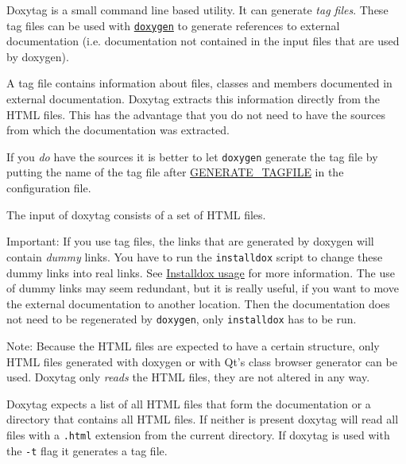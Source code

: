 Doxytag is a small command line based utility. It can generate {\em tag files\/}. These tag files can be used with \href{doxygen_usage.html}{\tt doxygen} to generate references to external documentation (i.e. documentation not contained in the input files that are used by doxygen).

A tag file contains information about files, classes and members documented in external documentation. Doxytag extracts this information directly from the HTML files. This has the advantage that you do not need to have the sources from which the documentation was extracted.

If you {\em do\/} have the sources it is better to let {\tt doxygen} generate the tag file by putting the name of the tag file after \hyperlink{config_cfg_generate_tagfile}{GENERATE\_\-TAGFILE} in the configuration file.

The input of doxytag consists of a set of HTML files.

\begin{Desc}
\item[Important:]If you use tag files, the links that are generated by doxygen will contain {\em dummy\/} links. You have to run the {\tt installdox} script to change these dummy links into real links. See \hyperlink{installdox_usage}{Installdox usage} for more information. The use of dummy links may seem redundant, but it is really useful, if you want to move the external documentation to another location. Then the documentation does not need to be regenerated by {\tt doxygen}, only {\tt installdox} has to be run.\end{Desc}
\begin{Desc}
\item[Note: ]Because the HTML files are expected to have a certain structure, only HTML files generated with doxygen or with Qt's class browser generator can be used. Doxytag only {\em reads\/} the HTML files, they are not altered in any way.\end{Desc}
Doxytag expects a list of all HTML files that form the documentation or a directory that contains all HTML files. If neither is present doxytag will read all files with a {\tt .html} extension from the current directory. If doxytag is used with the {\tt -t} flag it generates a tag file.

